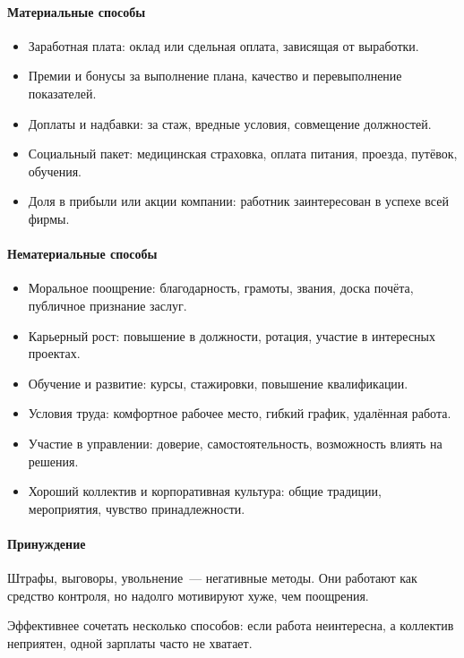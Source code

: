 \documentclass[12pt]{article}
\begin{document}
	\paragraph{Материальные способы}
	\begin{itemize}
		\item Заработная плата: оклад или сдельная оплата, зависящая от выработки.
		\item Премии и бонусы за выполнение плана, качество и перевыполнение показателей.
		\item Доплаты и надбавки: за стаж, вредные условия, совмещение должностей.
		\item Социальный пакет: медицинская страховка, оплата питания, проезда, путёвок, обучения.
		\item Доля в прибыли или акции компании: работник заинтересован в успехе всей фирмы.
	\end{itemize}

	\paragraph{Нематериальные способы}
	\begin{itemize}
		\item Моральное поощрение: благодарность, грамоты, звания, доска почёта, публичное признание заслуг.
		\item Карьерный рост: повышение в должности, ротация, участие в интересных проектах.
		\item Обучение и развитие: курсы, стажировки, повышение квалификации.
		\item Условия труда: комфортное рабочее место, гибкий график, удалённая работа.
		\item Участие в управлении: доверие, самостоятельность, возможность влиять на решения.
		\item Хороший коллектив и корпоративная культура: общие традиции, мероприятия, чувство принадлежности.
	\end{itemize}

	\paragraph{Принуждение}
	Штрафы, выговоры, увольнение~--- негативные методы. Они работают как средство контроля, но надолго мотивируют хуже, чем поощрения.

	\begin{note}
		Эффективнее сочетать несколько способов: если работа неинтересна, а коллектив неприятен, одной зарплаты часто не хватает.
	\end{note}
\end{document}
